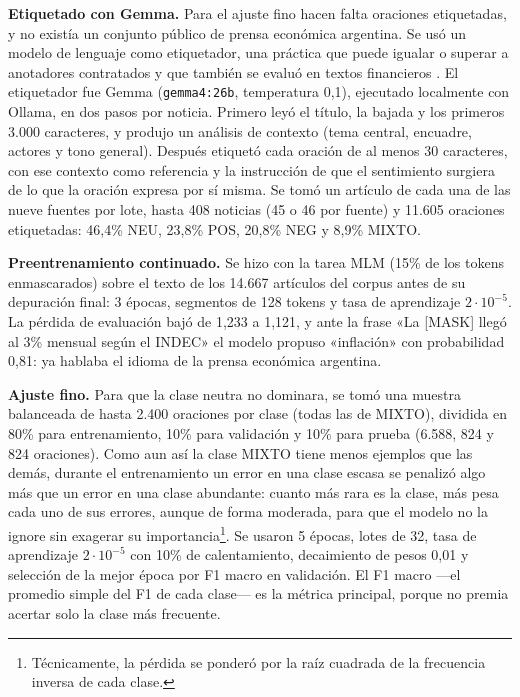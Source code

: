 \textbf{Etiquetado con Gemma.} Para el ajuste fino hacen falta oraciones etiquetadas, y no
existía un conjunto público de prensa económica argentina. Se usó un modelo de lenguaje como
etiquetador, una práctica que puede igualar o superar a anotadores contratados
\citep{gilardi2023chatgpt} y que también se evaluó en textos financieros
\citep{aguda2024llmannot}. El etiquetador fue Gemma \citep{gemma2026gemma4}
(\texttt{gemma4:26b}, temperatura 0,1), ejecutado localmente con Ollama, en dos pasos por
noticia. Primero leyó el título, la bajada y los primeros 3.000 caracteres, y produjo un
análisis de contexto (tema central, encuadre, actores y tono general). Después etiquetó cada
oración de al menos 30 caracteres, con ese contexto como referencia y la instrucción de que el
sentimiento surgiera de lo que la oración expresa por sí misma. Se tomó un artículo de cada una
de las nueve fuentes por lote, hasta 408 noticias (45 o 46 por fuente) y 11.605 oraciones
etiquetadas: 46,4\% NEU, 23,8\% POS, 20,8\% NEG y 8,9\% MIXTO.

\textbf{Preentrenamiento continuado.} Se hizo con la tarea MLM (15\% de los tokens
enmascarados) sobre el texto de los 14.667 artículos del corpus antes de su depuración final:
3 épocas, segmentos de 128 tokens y tasa de aprendizaje $2\cdot10^{-5}$. La pérdida de
evaluación bajó de 1,233 a 1,121, y ante la frase «La [MASK] llegó al 3\% mensual según el
INDEC» el modelo propuso «inflación» con probabilidad 0,81: ya hablaba el idioma de la prensa
económica argentina.

\textbf{Ajuste fino.} Para que la clase neutra no dominara, se tomó una muestra balanceada de
hasta 2.400 oraciones por clase (todas las de MIXTO), dividida en 80\% para entrenamiento,
10\% para validación y 10\% para prueba (6.588, 824 y 824 oraciones). Como aun así la clase
MIXTO tiene menos ejemplos que las demás, durante el entrenamiento un error en una clase escasa
se penalizó algo más que un error en una clase abundante: cuanto más rara es la clase, más pesa
cada uno de sus errores, aunque de forma moderada, para que el modelo no la ignore sin
exagerar su importancia\footnote{Técnicamente, la pérdida se ponderó por la raíz cuadrada de la
frecuencia inversa de cada clase.}. Se usaron 5 épocas, lotes de 32, tasa de aprendizaje
$2\cdot10^{-5}$ con 10\% de calentamiento, decaimiento de pesos 0,01 y selección de la mejor
época por F1 macro en validación. El F1 macro —el promedio simple del F1 de cada clase— es la
métrica principal, porque no premia acertar solo la clase más frecuente.


